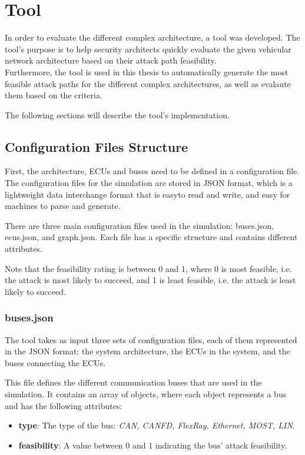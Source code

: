 \chapter{Tool}
\label{chp:tool}

In order to evaluate the different complex architecture, a tool was developed.
The tool's purpose is to help security architects quickly evaluate the given vehicular network architecture based on their \gls{attack path} feasibility.\\
Furthermore, the tool is used in this thesis to automatically generate the most feasible attack paths for the different complex architectures, 
as well as evalaute them based on the criteria.

The following sections will describe the tool's implementation.

\section{Configuration Files Structure}
\label{sec:config}

First, the architecture, ECUs and buses need to be defined in a configuration file.
The configuration files for the simulation are stored in JSON format, which is a lightweight data interchange format that is easyto read and write, and easy for machines to parse and generate.

There are three main configuration files used in the simulation: buses.json, ecus.json, and graph.json.
Each file has a specific structure and contains different attributes.

Note that the feasibility rating is between 0 and 1, where 0 is most feasible, i.e. the attack is most likely to succeed, and 1 is least feasible, i.e. the attack is least likely to succeed.

\subsection{buses.json}
\label{sec:buses}

The tool takes as input three sets of configuration files, each of them represented in the JSON format: 
the system architecture, the ECUs in the system, and the buses connecting the ECUs. 

This file defines the different communication buses that are used in the simulation. 
It contains an array of objects, where each object represents a bus and has the following attributes:

\begin{itemize}
\item \textbf{type}: The type of the bus: \textit{CAN, CANFD, FlexRay, Ethernet, MOST, LIN}.
\item \textbf{feasibility}: A value between 0 and 1 indicating the bus' attack feasibility.
\end{itemize}

